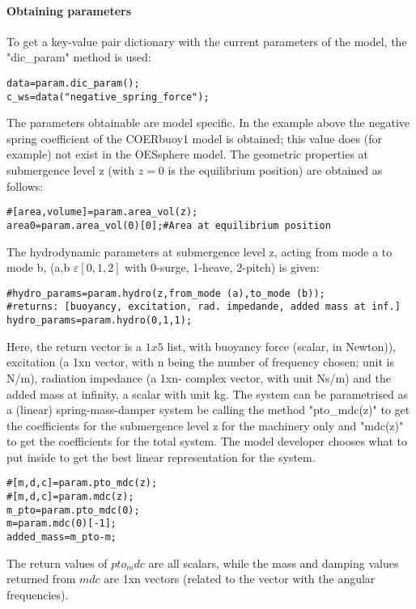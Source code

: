 \documentclass[oneside,10pt,a4paper]{book}
\begin{document}
\paragraph{Obtaining parameters}
To get a key-value pair dictionary with the current parameters of the model, the "dic\_param" method is used:
\begin{verbatim}
data=param.dic_param();
c_ws=data("negative_spring_force");
\end{verbatim}
The parameters obtainable are model specific. In the example above the negative spring coefficient of the COERbuoy1 model is obtained; this value does (for example) not exist in the OESsphere model.
The geometric properties at submergence level z (with $z=0$ is the equilibrium position) are obtained as follows:
\begin{verbatim}
#[area,volume]=param.area_vol(z);
area0=param.area_vol(0)[0];#Area at equilibrium position
\end{verbatim}
The hydrodynamic parameters at submergence level z, acting from mode a to mode b, (a,b $\varepsilon[0,1,2]$ with 0-surge, 1-heave, 2-pitch) is given:
\begin{verbatim}
#hydro_params=param.hydro(z,from_mode (a),to_mode (b));
#returns: [buoyancy, excitation, rad. impedande, added mass at inf.]
hydro_params=param.hydro(0,1,1);
\end{verbatim}
Here, the return vector is a $1x5$ list, with buoyancy force (scalar, in Newton)), excitation (a 1xn vector, with n being the number of frequency chosen; unit is N/m), radiation impedance (a 1xn- complex vector, with unit Ns/m) and the added mass at infinity, a scalar with unit kg.
The system can be parametrised as a (linear) spring-mass-damper system be calling the method "pto\_mdc(z)" to get the coefficients for the submergence level z for the machinery only and "mdc(z)" to get the coefficients for the total system. The model developer chooses what to put inside to get the best linear representation for the system.
\begin{verbatim}
#[m,d,c]=param.pto_mdc(z);
#[m,d,c]=param.mdc(z);
m_pto=param.pto_mdc(0);
m=param.mdc(0)[-1];
added_mass=m_pto-m;
\end{verbatim}
The return values of $pto_mdc$ are all scalars, while the mass and damping values returned from $mdc$ are 1xn vectors (related to the vector with the angular frequencies).
\end{document}
